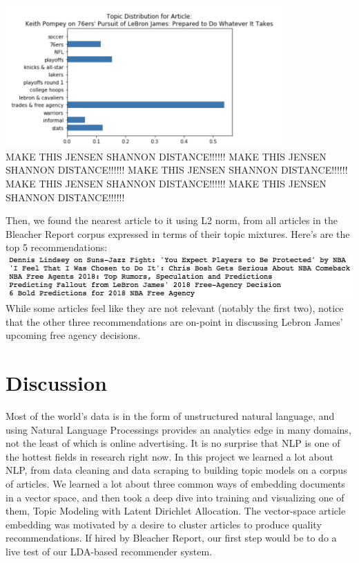 \documentclass[11pt]{article}
\begin{document}
\includegraphics[width=300pt]{newarttopics.png}\\

MAKE THIS JENSEN SHANNON DISTANCE!!!!!!
MAKE THIS JENSEN SHANNON DISTANCE!!!!!!
MAKE THIS JENSEN SHANNON DISTANCE!!!!!!
MAKE THIS JENSEN SHANNON DISTANCE!!!!!!
MAKE THIS JENSEN SHANNON DISTANCE!!!!!!

Then, we found the nearest article to it using L2 norm, from all articles in the Bleacher Report corpus expressed in terms of their topic mixtures. Here's are the top 5 recommendations: \\
 
 \includegraphics{preds.png}\\
 
 While some articles feel like they are not relevant (notably the first two), notice that the other three recommendations are on-point in discussing Lebron James' upcoming free agency decisions. 

\section{Discussion}
Most of the world's data is in the form of unstructured natural language, and using Natural Language Processings provides an analytics edge in many domains, not the least of which is online advertising.  It is no surprise that NLP is one of the hottest fields in research right now.  In this project we learned a lot about NLP, from data cleaning and data scraping to building topic models on a corpus of articles.  We learned a lot about three common ways of embedding documents in a vector space, and then took a deep dive into training and visualizing one of them, Topic Modeling with Latent Dirichlet Allocation. The vector-space article embedding was motivated by a desire to cluster articles to produce quality recommendations.  If hired by Bleacher Report, our first step would be to do a live test of our LDA-based recommender system.  
\end{document}
